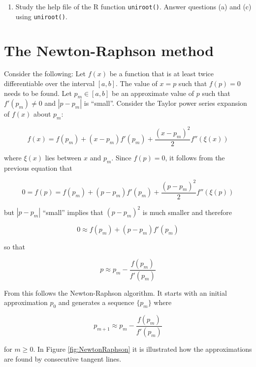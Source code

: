 \documentclass[
]{book}
\providecommand{\tightlist}{%
  \setlength{\itemsep}{0pt}\setlength{\parskip}{0pt}}
\begin{document}
\begin{enumerate}
\def\labelenumi{(\alph{enumi})}
\setcounter{enumi}{3}
\tightlist
\item
  Study the help file of the R function \texttt{uniroot()}. Answer questions (a) and (c) using \texttt{uniroot()}.
\end{enumerate}

\section{The Newton-Raphson method}\label{the-newton-raphson-method}

Consider the following: Let \(f(x)\) be a function that is at least twice differentiable over the interval \([a,b]\). The value of \(x=p\) such that \(f(p)=0\) needs to be found. Let \(p_m∈[a,b]\) be an approximate value of \(p\) such that \(f'(p_m) \neq 0\) and \(|p-p_m|\) is ``small''. Consider the Taylor power series expansion of \(f(x)\) about \(p_m\):

\[
f(x) = f(p_m) + (x - p_m)f'(p_m) + \frac{(x - p_m)^2}{2}f''(\xi(x))
\]

where \(\xi(x)\) lies between \(x\) and \(p_m\). Since \(f(p)=0\), it follows from the previous equation that

\[
0 = f(p) = f(p_m) + (p - p_m)f'(p_m) + \frac{(p - p_m)^2}{2}f''(\xi(p))
\]

but \(|p-p_m|\) ``small'' implies that \((p-p_m )^2\) is much smaller and therefore

\[
0 \approx f(p_m) + (p - p_m)f'(p_m)
\]

so that

\[
p \approx p_m - \frac{f(p_m)}{f'(p_m)}
\]

From this follows the Newton-Raphson algorithm. It starts with an initial approximation \(p_0\) and generates a sequence \(\{p_m \}\) where

\[
p_{m+1} \approx p_m - \frac{f(p_m)}{f'(p_m)}
\]

for \(m≥0\). In Figure \ref{fig:NewtonRaphson} it is illustrated how the approximations are found by consecutive tangent lines.
\end{document}
